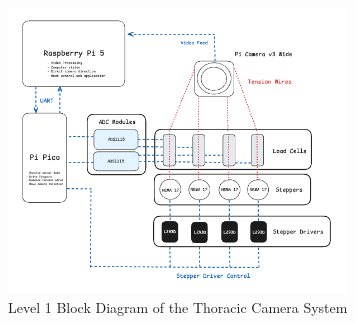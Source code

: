 \begin{figure}[H]
    \centering
    \includegraphics[width=0.8\textwidth]{images/level1.png}
    \caption{Level 1 Block Diagram of the Thoracic Camera System}
    \label{fig:level1}
\end{figure}

